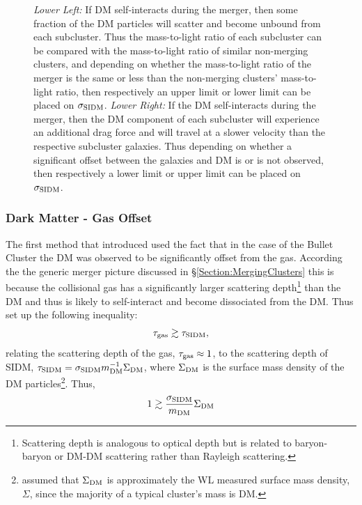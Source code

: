 \begin{figure}
{\emph{Lower Left:} If DM self-interacts during the merger, then some fraction of the DM particles will scatter and become unbound from each subcluster.
Thus the mass-to-light ratio of each subcluster can be compared with the mass-to-light ratio of similar non-merging clusters, and depending on whether the mass-to-light ratio of the merger is the same or less than the non-merging clusters' mass-to-light ratio, then respectively an upper limit or lower limit can be placed on $\sigma_{\rm SIDM}$.
\emph{Lower Right:} If the DM self-interacts during the merger, then the DM component of each subcluster will experience an additional drag force and will travel at a slower velocity than the respective subcluster galaxies.
Thus depending on whether a significant offset between the galaxies and DM is or is not observed, then respectively a lower limit or upper limit can be placed on $\sigma_{\rm SIDM}$.
\label{fig:4ConstraintMethods}}
\end{figure}

\subsubsection{Dark Matter - Gas Offset}
The first method that \citet{Markevitch:2004dl} introduced used the fact that in the case of the Bullet Cluster the DM was observed to be significantly offset from the gas.
According the the generic merger picture discussed in \S \ref{Section:MergingClusters} this is because the collisional gas has a significantly larger scattering depth\footnote{Scattering depth is analogous to optical depth but is related to baryon-baryon or DM-DM scattering rather than Rayleigh scattering.} than the DM and thus is likely to self-interact and become dissociated from the DM.
Thus \citet{Markevitch:2004dl} set up the following inequality: 
\begin{displaymath}
\tau_{\rm gas} \gtrsim \tau_{\rm SIDM},
\end{displaymath}
relating the scattering depth of the gas, $\tau_{\rm gas}\approx 1$, to the scattering depth of SIDM, $\tau_{\rm SIDM}=\sigma_{\rm SIDM}m^{-1}_{\rm DM} \Sigma_{\rm DM}$, where $\Sigma_{\rm DM}$ is the surface mass density of the DM particles\footnote{\citet{Markevitch:2004dl} assumed that $\Sigma_{\rm DM}$ is approximately the WL measured surface mass density, $\Sigma$, since the majority of a typical cluster's mass is DM.}.
Thus,
\begin{displaymath}
1 \gtrsim \frac{\sigma_{\rm SIDM}}{m_{\rm DM}} \Sigma_{\rm DM}
\end{displaymath}

